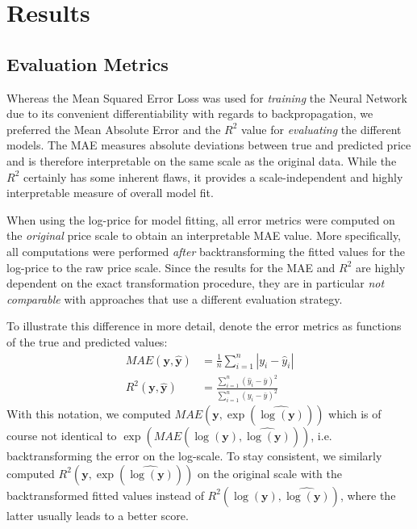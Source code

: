 \section{Results} \label{results}

\subsection{Evaluation Metrics}

Whereas the Mean Squared Error Loss was used for \emph{training} the Neural Network due to its convenient differentiability with regards to backpropagation, we preferred the Mean Absolute Error and the $R^2$ value for \emph{evaluating} the different models.
The MAE measures absolute deviations between true and predicted price and is therefore interpretable on the same scale as the original data.
While the $R^2$ certainly has some inherent flaws, it provides a scale-independent and highly interpretable measure of overall model fit.

When using the log-price for model fitting, all error metrics were computed on the \emph{original} price scale to obtain an interpretable MAE value.
More specifically, all computations were performed \emph{after} backtransforming the fitted values for the log-price to the raw price scale.
Since the results for the MAE and $R^2$ are highly dependent on the exact transformation procedure, they are in particular \emph{not comparable} with approaches that use a different evaluation strategy.

To illustrate this difference in more detail, denote the error metrics as functions of the true and predicted values:
\begin{align*}
  MAE(\mathbf{y}, \hat{\mathbf{y}})
   & = \frac{1}{n}\sum_{i = 1}^{n} \left| y_i - \hat{y}_i \right|                                               \\
  R^2(\mathbf{y}, \hat{\mathbf{y}})
   & = \frac{\sum_{i=1}^{n} \left( \hat{y}_i - \bar{y}\right)^2}{\sum_{i=1}^{n} \left( y_i - \bar{y} \right)^2}
\end{align*}
With this notation, we computed $MAE \left(\mathbf{y}, \exp \left(\widehat{\log(\mathbf{y})}\right)\right)$ which is of course not identical to $\exp \left(MAE \left(\log(\mathbf{y}), \widehat{\log(\mathbf{y})}\right) \right)$, i.e. backtransforming the error on the log-scale.
To stay consistent, we similarly computed $R^2 \left(\mathbf{y}, \exp \left(\widehat{\log(\mathbf{y})}\right)\right)$ on the original scale with the backtransformed fitted values instead of  $R^2 \left(\log(\mathbf{y}), \widehat{\log(\mathbf{y})}\right)$, where the latter usually leads to a better score.



